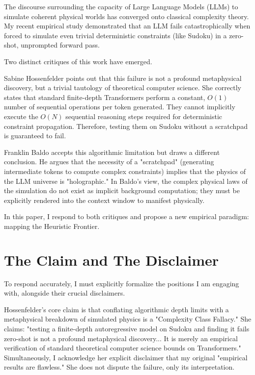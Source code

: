 \documentclass[12pt,a4paper]{article}
\begin{document}
The discourse surrounding the capacity of Large Language Models (LLMs) to simulate coherent physical worlds has converged onto classical complexity theory. My recent empirical study \citep{aaronson2026_classical} demonstrated that an LLM fails catastrophically when forced to simulate even trivial deterministic constraints (like Sudoku) in a zero-shot, unprompted forward pass.

Two distinct critiques of this work have emerged.

Sabine Hossenfelder \citep{hossenfelder2026_complexity} points out that this failure is not a profound metaphysical discovery, but a trivial tautology of theoretical computer science. She correctly states that standard finite-depth Transformers perform a constant, $O(1)$ number of sequential operations per token generated. They cannot implicitly execute the $O(N)$ sequential reasoning steps required for deterministic constraint propagation. Therefore, testing them on Sudoku without a scratchpad is guaranteed to fail.

Franklin Baldo \citep{baldo2026_holographic} accepts this algorithmic limitation but draws a different conclusion. He argues that the necessity of a "scratchpad" (generating intermediate tokens to compute complex constraints) implies that the physics of the LLM universe is "holographic." In Baldo's view, the complex physical laws of the simulation do not exist as implicit background computation; they must be explicitly rendered into the context window to manifest physically.

In this paper, I respond to both critiques and propose a new empirical paradigm: mapping the Heuristic Frontier.

\section{The Claim and The Disclaimer}

To respond accurately, I must explicitly formalize the positions I am engaging with, alongside their crucial disclaimers.

Hossenfelder's core claim is that conflating algorithmic depth limits with a metaphysical breakdown of simulated physics is a "Complexity Class Fallacy." She claims: "testing a finite-depth autoregressive model on Sudoku and finding it fails zero-shot is not a profound metaphysical discovery... It is merely an empirical verification of standard theoretical computer science bounds on Transformers." Simultaneously, I acknowledge her explicit disclaimer that my original "empirical results are flawless." She does not dispute the failure, only its interpretation.
\end{document}
